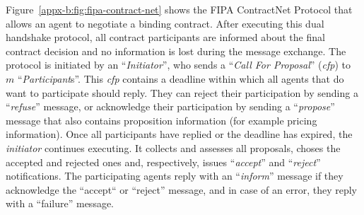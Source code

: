 Figure~\ref{appx-b:fig:fipa-contract-net} shows the FIPA ContractNet Protocol that allows an agent to negotiate a binding contract.
After executing this dual handshake protocol, all contract participants are informed about the final contract decision and no information is lost during the message exchange.
The protocol is initiated by an ``\textit{Initiator}'', who sends a ``\textit{Call For Proposal}'' (\textit{cfp}) to $m$ ``\textit{Participant}s''.
This \textit{cfp} contains a deadline within which all agents that do want to participate should reply.
They can reject their participation by sending a ``\textit{refuse}'' message, or acknowledge their participation by sending a ``\textit{propose}'' message that also contains proposition information (for example pricing information).
Once all participants have replied or the deadline has expired, the \textit{initiator} continues executing.
It collects and assesses all proposals, choses the accepted and rejected ones and, respectively, issues ``\textit{accept}'' and ``\textit{reject}'' notifications.
The participating agents reply with an ``\textit{inform}'' message if they acknowledge the ``accept`` or ``reject'' message, and in case of an error, they reply with a ``failure'' message.






